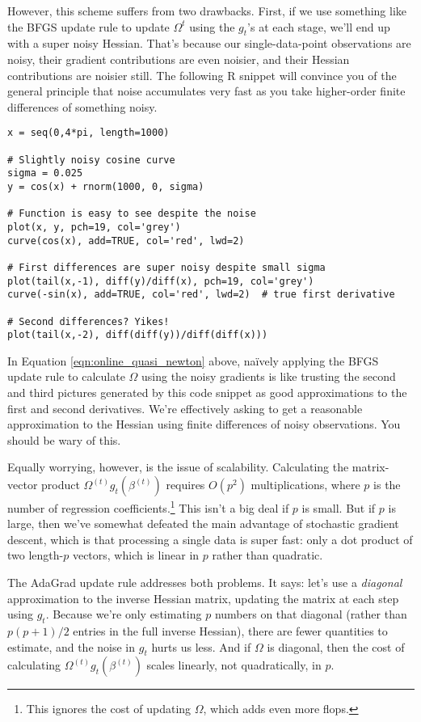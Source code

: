 \documentclass{mynotes}
\begin{document}
However, this scheme suffers from two drawbacks.  First, if we use something like the BFGS update rule to update $\Omega^t$ using the $g_t$'s at each stage, we'll end up with a super noisy Hessian.  That's because our single-data-point observations are noisy, their gradient contributions are even noisier, and their Hessian contributions are noisier still.  The following R snippet will convince you of the general principle that noise accumulates very fast as you take higher-order finite differences of something noisy.
\begin{verbatim}
x = seq(0,4*pi, length=1000)

# Slightly noisy cosine curve
sigma = 0.025
y = cos(x) + rnorm(1000, 0, sigma)

# Function is easy to see despite the noise
plot(x, y, pch=19, col='grey')
curve(cos(x), add=TRUE, col='red', lwd=2)

# First differences are super noisy despite small sigma
plot(tail(x,-1), diff(y)/diff(x), pch=19, col='grey')
curve(-sin(x), add=TRUE, col='red', lwd=2)  # true first derivative

# Second differences? Yikes!
plot(tail(x,-2), diff(diff(y))/diff(diff(x)))
\end{verbatim}
In Equation \ref{eqn:online_quasi_newton} above, na\"ively applying the BFGS update rule to calculate $\Omega$ using the noisy gradients is like trusting the second and third pictures generated by this code snippet as good approximations to the first and second derivatives.  We're effectively asking to get a reasonable approximation to the Hessian using finite differences of noisy observations.  You should be wary of this.

Equally worrying, however, is the issue of scalability.  Calculating the matrix-vector product $\Omega^{(t)} g_t(\beta^{(t)})$ requires $O(p^2)$ multiplications, where $p$ is the number of regression coefficients.\footnote{This ignores the cost of updating $\Omega$, which adds even more flops.}  This isn't a big deal if $p$ is small.  But if $p$ is large, then we've somewhat defeated the main advantage of stochastic gradient descent, which is that processing a single data is super fast: only a dot product of two length-$p$ vectors, which is linear in $p$ rather than quadratic.

The AdaGrad update rule addresses both problems.  It says: let's use a \textit{diagonal} approximation to the inverse Hessian matrix, updating the matrix at each step using $g_t$.  Because we're only estimating $p$ numbers on that diagonal (rather than $p(p+1)/2$ entries in the full inverse Hessian), there are fewer quantities to estimate, and the noise in $g_t$ hurts us less.  And if $\Omega$ is diagonal, then the cost of calculating $\Omega^{(t)} g_t(\beta^{(t)})$ scales linearly, not quadratically, in $p$.
\end{document}
